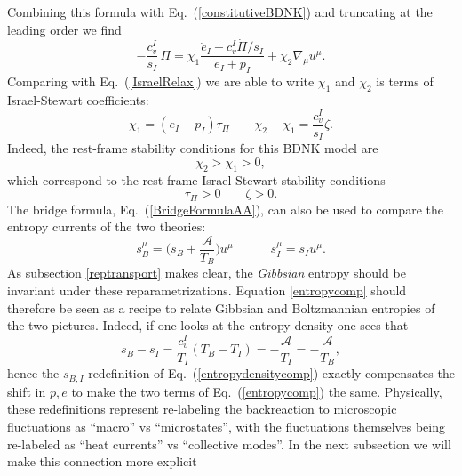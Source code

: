 \documentclass[12pt,onecolumn,showpacs,amssymb,aps,nofootinbib,floatfix]{revtex4-2}
\renewcommand{\eqref}[1]{Eq.~(\ref{#1})}
\begin{document}
	Combining this formula with \eqref{constitutiveBDNK} and truncating at the leading order we find
	\begin{equation}
		- \frac{c_v^I}{s_I} \, \Pi = \chi_1 \frac{\dot{e}_I + c_v^I \dot{\Pi}/s_I }{e_I+p_I} + \chi_2 \nabla_\mu u^\mu.
	\end{equation}
	Comparing with \eqref{IsraelRelax} we are able to write $\chi_1$ and $\chi_2$ is terms of Israel-Stewart coefficients:
	\begin{equation}\label{matchingCoefficients}
		\chi_1 = (e_I +p_I) \tau_\Pi \quad \quad \chi_2 - \chi_1 = \frac{c_v^I}{s_I} \zeta. 
	\end{equation}
	Indeed, the rest-frame stability conditions for this BDNK model are
	\begin{equation}
		\chi_2 > \chi_1 >0,
	\end{equation}
	which correspond to the rest-frame Israel-Stewart stability conditions
	\begin{equation}
		\tau_\Pi >0  \quad \quad \zeta >0.
	\end{equation}
	The bridge formula, \eqref{BridgeFormulaAA}, can also be used to compare the entropy currents of the two theories:
	\begin{equation}
		\label{entropycomp}
		s_B^\mu = \bigg( s_B + \frac{\mathcal{A}}{T_B}  \bigg)u^\mu  \quad \quad \quad s_I^\mu = s_I u^\mu.
	\end{equation}
        \color{black}
        As subsection \ref{reptransport} makes clear, the {\em Gibbsian} entropy should be invariant under these reparametrizations. Equation \ref{entropycomp} should therefore be seen as a recipe to relate Gibbsian and Boltzmannian entropies of the two pictures.   Indeed, if one looks at the entropy density one sees that
	\begin{equation}
          \label{entropydensitycomp}
		s_B-s_I = \frac{c_v^I}{T_I} (T_B-T_I)= -\frac{\mathcal{A}}{T_I}= -\frac{\mathcal{A}}{T_B},
	\end{equation}
        hence the $s_{B,I}$ redefinition of \eqref{entropydensitycomp} exactly compensates the shift in $p,e$ to make the two terms of \eqref{entropycomp} the same.    Physically, these redefinitions represent re-labeling the backreaction to microscopic fluctuations as ``macro'' vs ``microstates'', with the fluctuations themselves being re-labeled as ``heat currents'' vs ``collective modes''.   In the next subsection we will make this connection more explicit\color{black}
\end{document}
